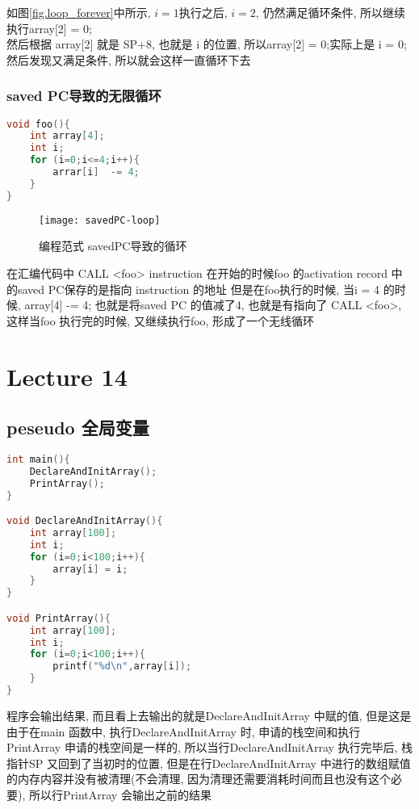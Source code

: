 \documentclass{article}
\begin{document}
如图\ref{fig.loop_forever}中所示, $i=1$执行之后, $i=2$, 仍然满足循环条件, 所以继续执行array[2] = 0;\\
然后根据 array[2] 就是 SP+8, 也就是 i 的位置, 所以array[2] = 0;实际上是 i = 0; 然后发现又满足条件, 所以就会这样一直循环下去

\subsubsection{saved PC导致的无限循环}
\begin{lstlisting}[language = C]
void foo(){
	int array[4];
	int i;
	for (i=0;i<=4;i++){
		arrar[i]  -= 4;
	}
}
\end{lstlisting}
\begin{figure}[htbp]
	\centering
	\texttt{[image: savedPC-loop]}\\
	\caption{编程范式 savedPC导致的循环}\label{fig.savedPC-loop}
\end{figure}

在汇编代码中
CALL <foo>
instruction
在开始的时候foo 的activation record 中的saved PC保存的是指向 instruction 的地址
但是在foo执行的时候, 当i = 4 的时候, array[4] -= 4; 也就是将saved PC 的值减了4, 也就是有指向了 CALL <foo>, 这样当foo 执行完的时候, 又继续执行foo, 形成了一个无线循环

\section{Lecture 14}
\subsection{peseudo 全局变量}
\begin{lstlisting}[language = C]
int main(){
	DeclareAndInitArray();
	PrintArray();
}

void DeclareAndInitArray(){
	int array[100];
	int i;
	for (i=0;i<100;i++){
		array[i] = i;
	}
}

void PrintArray(){
	int array[100];
	int i;
	for (i=0;i<100;i++){
		printf("%d\n",array[i]);
	}
}
\end{lstlisting}
程序会输出结果, 而且看上去输出的就是DeclareAndInitArray 中赋的值, 但是这是由于在main 函数中, 执行DeclareAndInitArray 时, 申请的栈空间和执行PrintArray 申请的栈空间是一样的,
所以当行DeclareAndInitArray 执行完毕后, 栈指针SP 又回到了当初时的位置, 但是在行DeclareAndInitArray 中进行的数组赋值的内存内容并没有被清理(不会清理, 因为清理还需要消耗时间而且也没有这个必要), 所以行PrintArray 会输出之前的结果
\end{document}
